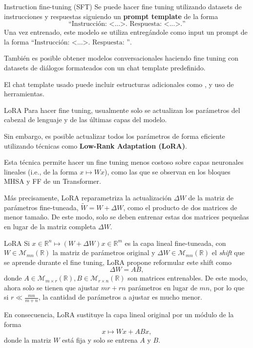 \documentclass{beamer}
\newcommand{\R}{\mathbb{R}}
\begin{document}
\begin{frame}{Instruction fine-tuning (SFT)}
    Se puede hacer fine tuning utilizando datasets de instrucciones y respuestas siguiendo un \textbf{prompt template} de la forma
    \begin{equation*}
        \text{``Instrucción: <...>. Respuesta: <...>.''}
    \end{equation*}
    Una vez entrenado, este modelo se utiliza entregándole como input un prompt de la forma $\text{``Instrucción: <...>. Respuesta: ''}$.

    También es posible obtener modelos conversacionales haciendo fine tuning con datasets de diálogos formateados con un chat template predefinido.

    El chat template usado puede incluir estructuras adicionales como ,  y uso de herramientas.
\end{frame}

\begin{frame}{LoRA}
    Para hacer fine tuning, usualmente solo se actualizan los parámetros del cabezal de lenguaje y de las últimas capas del modelo.

    Sin embargo, es posible actualizar todos los parámetros de forma eficiente utilizando técnicas como \textbf{Low-Rank Adaptation (LoRA)}.

    Esta técnica permite hacer un fine tuning menos costoso sobre capas neuronales lineales (i.e., de la forma $x\mapsto Wx$), como las que se observan en los bloques MHSA y FF de un Transformer.

    Más precisamente, LoRA reparametriza la actualización $\Delta W$ de la matriz de parámetros fine-tuneada, $\tilde W=W+\Delta W$, como el producto de dos matrices de menor tamaño. De este modo, solo se deben entrenar estas dos matrices pequeñas en lugar de la matriz completa $\Delta W$.
\end{frame}

\begin{frame}{LoRA}
    Si $x\in\R^n \mapsto (W+\Delta W)x\in\R^m$ es la capa lineal fine-tuneada, con $W\in\mathcal{M}_{mn}(\R)$ la matriz de parámetros original y $\Delta W\in\mathcal{M}_{mn}(\R)$ el \textit{shift} que se aprende durante el fine tuning, LoRA propone reformular este shift como
    \begin{equation*}
        \Delta W=AB,
    \end{equation*}
    donde $A\in\mathcal{M}_{m\times r}(\R), B\in\mathcal{M}_{r\times n}(\R)$ son matrices entrenables. De este modo, ahora solo se tienen que ajustar $mr+rn$ parámetros en lugar de $mn$, por lo que si $r\ll\frac{mn}{m+n}$, la cantidad de parámetros a ajustar es mucho menor.

    En consecuencia, LoRA sustituye la capa lineal original por un módulo de la forma
    \begin{equation*}
        x\mapsto  Wx + ABx,
    \end{equation*}
    donde la matriz $W$ está fija y solo se entrena $A$ y $B$.
\end{frame}
\end{document}
